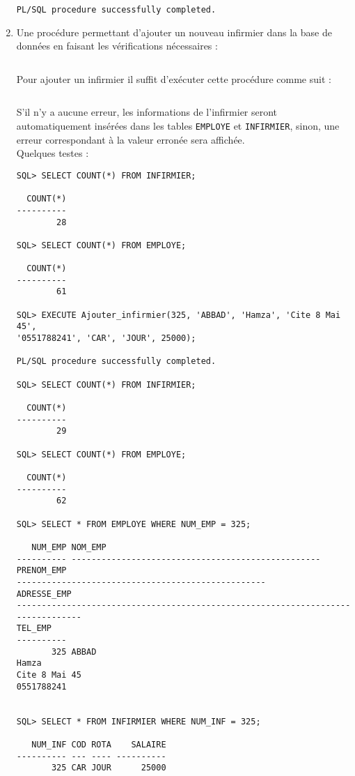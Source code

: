 \documentclass[12pt,a4paper]{article}
\begin{document}
\begin{enumerate}
\begin{snugshade}
\begin{verbatim}
PL/SQL procedure successfully completed.
        \end{verbatim}
    \end{snugshade}
    \item Une procédure permettant d'ajouter un nouveau infirmier dans la base de données en faisant les vérifications nécessaires :
    \begin{snugshade}
        \inputminted[firstline=71, lastline=99]{SQL}{../Scripts/TP4.sql}
    \end{snugshade}
    Pour ajouter un infirmier il suffit d'exécuter cette procédure comme suit :
    \begin{snugshade}
        \inputminted[firstline=100, lastline=100]{SQL}{../Scripts/TP4.sql}
    \end{snugshade}
    S'il n'y a aucune erreur, les informations de l'infirmier seront automatiquement insérées dans les tables \texttt{EMPLOYE} et
    \texttt{INFIRMIER}, sinon, une erreur correspondant à la valeur erronée sera affichée.\\
    Quelques testes :
    \begin{snugshade}
        \begin{verbatim}
SQL> SELECT COUNT(*) FROM INFIRMIER;

  COUNT(*)
----------
        28

SQL> SELECT COUNT(*) FROM EMPLOYE;

  COUNT(*)
----------
        61

SQL> EXECUTE Ajouter_infirmier(325, 'ABBAD', 'Hamza', 'Cite 8 Mai 45',
'0551788241', 'CAR', 'JOUR', 25000);

PL/SQL procedure successfully completed.

SQL> SELECT COUNT(*) FROM INFIRMIER;

  COUNT(*)
----------
        29

SQL> SELECT COUNT(*) FROM EMPLOYE;

  COUNT(*)
----------
        62

SQL> SELECT * FROM EMPLOYE WHERE NUM_EMP = 325;

   NUM_EMP NOM_EMP
---------- --------------------------------------------------
PRENOM_EMP
--------------------------------------------------
ADRESSE_EMP
--------------------------------------------------------------------------------
TEL_EMP
----------
       325 ABBAD
Hamza
Cite 8 Mai 45
0551788241


SQL> SELECT * FROM INFIRMIER WHERE NUM_INF = 325;

   NUM_INF COD ROTA    SALAIRE
---------- --- ---- ----------
       325 CAR JOUR      25000


\end{verbatim}
\end{snugshade}
\end{enumerate}
\end{document}
